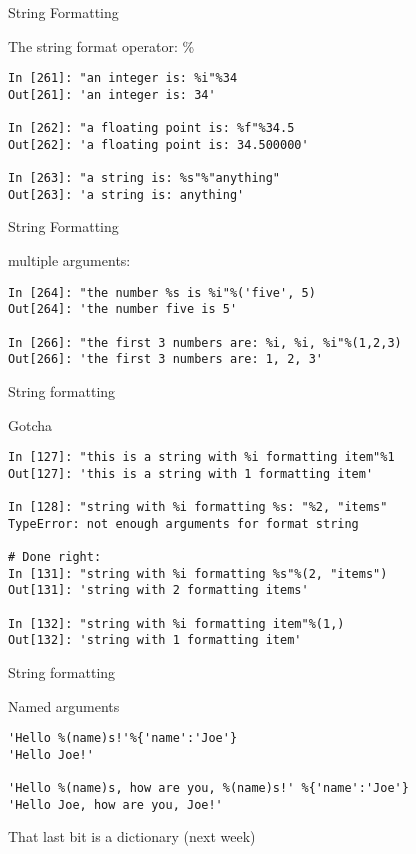 \documentclass{beamer}
\begin{document}
\begin{frame}[fragile]{String Formatting}

{\Large The string format operator: \%}

\begin{verbatim}
In [261]: "an integer is: %i"%34
Out[261]: 'an integer is: 34'

In [262]: "a floating point is: %f"%34.5
Out[262]: 'a floating point is: 34.500000'

In [263]: "a string is: %s"%"anything"
Out[263]: 'a string is: anything'
\end{verbatim}

\end{frame} 

\begin{frame}[fragile]{String Formatting}

{\Large multiple arguments:}

\begin{verbatim}
In [264]: "the number %s is %i"%('five', 5)
Out[264]: 'the number five is 5'

In [266]: "the first 3 numbers are: %i, %i, %i"%(1,2,3)
Out[266]: 'the first 3 numbers are: 1, 2, 3'

\end{verbatim}

\end{frame} 

\begin{frame}[fragile]{String formatting}

{\Large Gotcha}

\begin{verbatim}
In [127]: "this is a string with %i formatting item"%1 
Out[127]: 'this is a string with 1 formatting item'

In [128]: "string with %i formatting %s: "%2, "items" 
TypeError: not enough arguments for format string

# Done right:
In [131]: "string with %i formatting %s"%(2, "items")
Out[131]: 'string with 2 formatting items'

In [132]: "string with %i formatting item"%(1,)
Out[132]: 'string with 1 formatting item' 
\end{verbatim}

\end{frame}

\begin{frame}[fragile]{String formatting}

{\Large Named arguments}

\begin{verbatim}
'Hello %(name)s!'%{'name':'Joe'}
'Hello Joe!'

'Hello %(name)s, how are you, %(name)s!' %{'name':'Joe'}
'Hello Joe, how are you, Joe!'
\end{verbatim}
\vfill
{\Large That last bit is a dictionary (next week) }

\end{frame}
\end{document}
